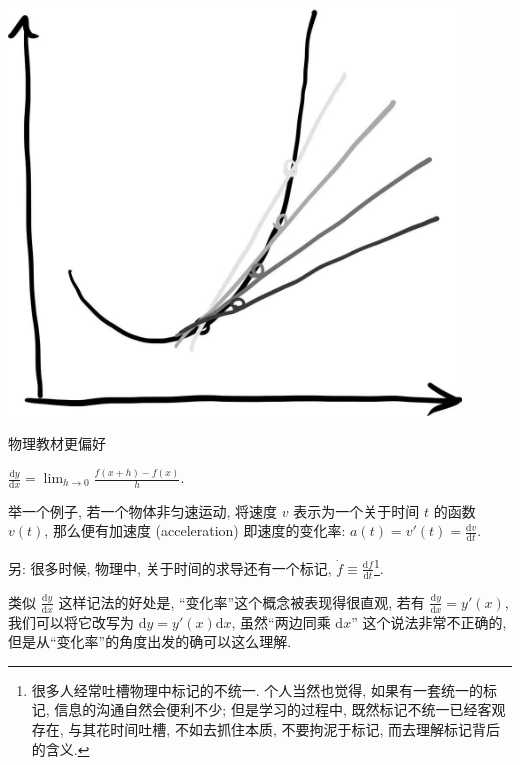 \begin{tcolorbox}[size=fbox, breakable, enhanced jigsaw, title={导数 (derivative)}]
\begin{tcolorbox}[size=fbox, breakable, enhanced jigsaw, sidebyside]
\includegraphics[width=0.9\textwidth]{img/image-20230614124234964.png}
\tcblower
{}
\end{tcolorbox}

物理教材更偏好

$\frac{\mathrm{d}y}{\mathrm{d}x}=\lim_{h\rightarrow0}\frac{f(x+h)-f(x)}{h}.$

\begin{newquote}
举一个例子, 若一个物体非匀速运动, 将速度 $v$ 表示为一个关于时间 $t$
的函数 $v(t)$, 那么便有加速度 (acceleration) 即速度的变化率:
$a(t)=v'(t)=\frac{\mathrm{d}v}{\mathrm{d}t}$.

另: 很多时候, 物理中, 关于时间的求导还有一个标记,
$\dot{f}\equiv \frac{\mathrm{d}f}{\mathrm{d}t}$\footnote{很多人经常吐槽物理中标记的不统一.
  个人当然也觉得, 如果有一套统一的标记, 信息的沟通自然会便利不少;
  但是学习的过程中, 既然标记不统一已经客观存在, 与其花时间吐槽,
  不如去抓住本质, 不要拘泥于标记, 而去理解标记背后的含义.}.
\end{newquote}

类似 $\frac{\mathrm{d}y}{\mathrm{d}x}$ 这样记法的好处是,
``变化率''这个概念被表现得很直观, 若有
$\frac{\mathrm{d}y}{\mathrm{d}x}=y'(x)$, 我们可以将它改写为
$\mathrm{d}y=y'(x)\mathrm{d}x$, 虽然``两边同乘 $\mathrm{d}x$''
这个说法非常不正确的, 但是从``变化率''的角度出发的确可以这么理解.


\end{tcolorbox}
